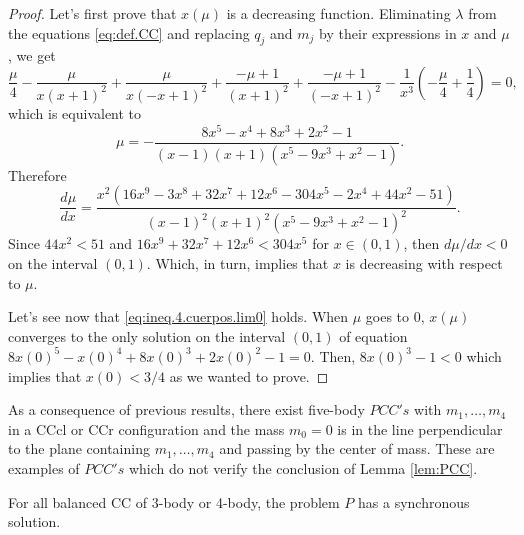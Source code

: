 \documentclass[smallcondensed]{svjour3}
\begin{document}
\begin{proof}
Let's first prove that $x(\mu)$ is a decreasing function. Eliminating $\lambda$ from the equations \eqref{eq:def.CC} and replacing $q_j$ and $m_j$ by their expressions in $x$ and $\mu$, we get
\[\frac{\mu}{4} - \frac{\mu}{x \left(x + 1\right)^{2}} + \frac{\mu}{x \left(- x + 1\right)^{2}} + \frac{- \mu + 1}{\left(x + 1\right)^{2}} + \frac{- \mu + 1}{\left(- x + 1\right)^{2}} - \frac{1}{x^{3}} \left(- \frac{\mu}{4} + \frac{1}{4}\right) = 0,\]
which is equivalent to
 \[\mu=- \frac{8 x^{5} - x^{4} + 8 x^{3} + 2 x^{2} - 1}{\left(x - 1\right) \left(x + 1\right) \left(x^{5} - 9 x^{3} + x^{2} - 1\right)}.\]
Therefore
\[
 \frac{d\mu}{dx}=\frac{x^{2} \left(16 x^{9} - 3 x^{8} + 32 x^{7} + 12 x^{6} - 304 x^{5} - 2 x^{4} + 44 x^{2} - 51\right)}{\left(x - 1\right)^{2} \left(x + 1\right)^{2} \left(x^{5} - 9 x^{3} + x^{2} - 1\right)^{2}}.
\]
Since $44x^2<51$ and $16 x^{9}  + 32 x^{7} + 12 x^{6} < 304 x^{5}$ for $x\in (0,1)$, then $d\mu/dx<0$ on the interval $ (0,1)$. Which, in turn, implies that $x$ is decreasing with respect to $\mu$.





Let's see now that \eqref{eq:ineq.4.cuerpos.lim0} holds. When $\mu$ goes to $0$, $x(\mu)$ converges to the only solution  on the interval $(0,1)$ of  equation $8 x(0)^{5} - x(0)^{4} + 8 x(0)^{3} + 2 x(0)^{2} - 1=0$.  Then,  $ 8 x(0)^{3} -1< 0$ which implies that $x(0)<3/4$ as we wanted to prove.
\end{proof}


\begin{remark}
As a consequence of previous results, there exist five-body $PCC's$ with $m_1,\ldots,m_4$  in a CCcl or CCr configuration and the mass $m_0=0$ is in the  line perpendicular to the  plane containing $m_1,\ldots,m_4$ and passing by the center of mass. These are examples of $PCC's$ which do not verify the conclusion of Lemma \ref{lem:PCC}.
\end{remark}


\begin{corollary}
For all  balanced CC of 3-body or 4-body, the  problem $P$ has a synchronous solution.
\end{corollary}
\end{document}
